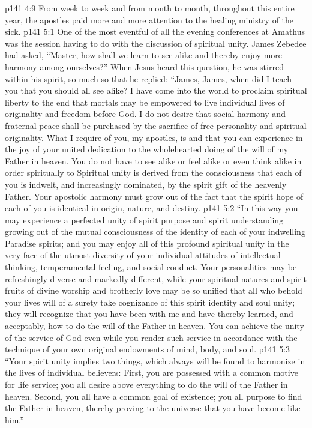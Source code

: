 \vs p141 4:9 From week to week and from month to month, throughout this entire year, the apostles paid more and more attention to the healing ministry of the sick.
\vs p141 5:1 One of the most eventful of all the evening conferences at Amathus was the session having to do with the discussion of spiritual unity. James Zebedee had asked, “Master, how shall we learn to see alike and thereby enjoy more harmony among ourselves?” When Jesus heard this question, he was stirred within his spirit, so much so that he replied: \textcolor{ubdarkred}{“James, James, when did I teach you that you should all see alike? I have come into the world to proclaim spiritual liberty to the end that mortals may be empowered to live individual lives of originality and freedom before God. I do not desire that social harmony and fraternal peace shall be purchased by the sacrifice of free personality and spiritual originality. What I require of you, my apostles, is and that you can experience in the joy of your united dedication to the wholehearted doing of the will of my Father in heaven. You do not have to see alike or feel alike or even think alike in order spiritually to  Spiritual unity is derived from the consciousness that each of you is indwelt, and increasingly dominated, by the spirit gift of the heavenly Father. Your apostolic harmony must grow out of the fact that the spirit hope of each of you is identical in origin, nature, and destiny.}\plusone
\vs p141 5:2 \textcolor{ubdarkred}{“In this way you may experience a perfected unity of spirit purpose and spirit understanding growing out of the mutual consciousness of the identity of each of your indwelling Paradise spirits; and you may enjoy all of this profound spiritual unity in the very face of the utmost diversity of your individual attitudes of intellectual thinking, temperamental feeling, and social conduct. Your personalities may be refreshingly diverse and markedly different, while your spiritual natures and spirit fruits of divine worship and brotherly love may be so unified that all who behold your lives will of a surety take cognizance of this spirit identity and soul unity; they will recognize that you have been with me and have thereby learned, and acceptably, how to do the will of the Father in heaven. You can achieve the unity of the service of God even while you render such service in accordance with the technique of your own original endowments of mind, body, and soul.}
\vs p141 5:3 \textcolor{ubdarkred}{“Your spirit unity implies two things, which always will be found to harmonize in the lives of individual believers: First, you are possessed with a common motive for life service; you all desire above everything to do the will of the Father in heaven. Second, you all have a common goal of existence; you all purpose to find the Father in heaven, thereby proving to the universe that you have become like him.”}
